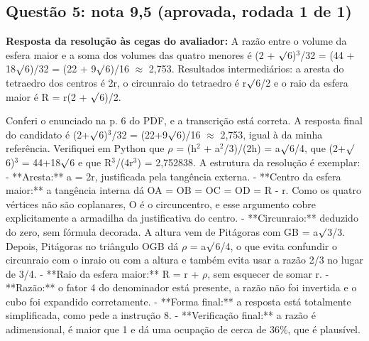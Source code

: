 \documentclass{article}%
\begin{document}
\subsection*{Questão 5: nota 9,5 (aprovada, rodada 1 de 1)}%
\textbf{Resposta da resolução às cegas do avaliador:} A razão entre o volume da esfera maior e a soma dos volumes das quatro menores é (2 + $\surd$6)$^3$/32 = (44 + 18$\surd$6)/32 = (22 + 9$\surd$6)/16 $\approx$ 2,753.\newline%
\newline%
Resultados intermediários: a aresta do tetraedro dos centros é 2r, o circunraio do tetraedro é r$\surd$6/2 e o raio da esfera maior é R = r(2 + $\surd$6)/2.\par %
Conferi o enunciado na p. 6 do PDF, e a transcrição está correta. A resposta final do candidato é (2+$\surd$6)$^3$/32 = (22+9$\surd$6)/16 $\approx$ 2,753, igual à da minha referência. Verifiquei em Python que $\rho$ = (h$^2$ + a$^2$/3)/(2h) = a$\surd$6/4, que (2+$\surd$6)$^3$ = 44+18$\surd$6 e que R$^3$/(4r$^3$) = 2,752838.\newline%
\newline%
A estrutura da resolução é exemplar:\newline%
{-} **Aresta:** a = 2r, justificada pela tangência externa.\newline%
{-} **Centro da esfera maior:** a tangência interna dá OA = OB = OC = OD = R - r. Como os quatro vértices não são coplanares, O é o circuncentro, e esse argumento cobre explicitamente a armadilha da justificativa do centro.\newline%
{-} **Circunraio:** deduzido do zero, sem fórmula decorada. A altura vem de Pitágoras com GB = a$\surd$3/3. Depois, Pitágoras no triângulo OGB dá $\rho$ = a$\surd$6/4, o que evita confundir o circunraio com o inraio ou com a altura e também evita usar a razão 2/3 no lugar de 3/4.\newline%
{-} **Raio da esfera maior:** R = r + $\rho$, sem esquecer de somar r.\newline%
{-} **Razão:** o fator 4 do denominador está presente, a razão não foi invertida e o cubo foi expandido corretamente.\newline%
{-} **Forma final:** a resposta está totalmente simplificada, como pede a instrução 8.\newline%
{-} **Verificação final:** a razão é adimensional, é maior que 1 e dá uma ocupação de cerca de 36\%, que é plausível.\newline%
\newline%
\end{document}
